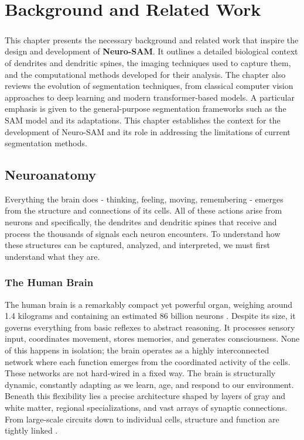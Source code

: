 \chapter{Background and Related Work}

\paragraph{}
This chapter presents the necessary background and related work that inspire the design and development of \textbf{Neuro-SAM}. It outlines a detailed biological context of dendrites and dendritic spines, the imaging techniques used to capture them, and the computational methods developed for their analysis. The chapter also reviews the evolution of segmentation techniques, from classical computer vision approaches to deep learning and modern transformer-based models. A particular emphasis is given to the general-purpose segmentation frameworks such as the \gls{SAM} model and its adaptations. This chapter establishes the context for the development of Neuro-\gls{SAM} and its role in addressing the limitations of current segmentation methods.

\section{Neuroanatomy}
Everything the brain does - thinking, feeling, moving, remembering - emerges from the structure and connections of its cells. All of these actions arise from neurons and specifically, the dendrites and dendritic spines that receive and process the thousands of signals each neuron encounters. To understand how these structures can be captured, analyzed, and interpreted, we must first understand what they are.

\subsection{The Human Brain}
The human brain is a remarkably compact yet powerful organ, weighing around 1.4 kilograms and containing an estimated 86 billion neurons \cite{Azevedo_2009}. Despite its size, it governs everything from basic reflexes to abstract reasoning. It processes sensory input, coordinates movement, stores memories, and generates consciousness. None of this happens in isolation; the brain operates as a highly interconnected network where each function emerges from the coordinated activity of the cells.
These networks are not hard-wired in a fixed way. The brain is structurally dynamic, constantly adapting as we learn, age, and respond to our environment. Beneath this flexibility lies a precise architecture shaped by layers of gray and white matter, regional specializations, and vast arrays of synaptic connections. From large-scale circuits down to individual cells, structure and function are tightly linked \cite{Bassett_2017}.

